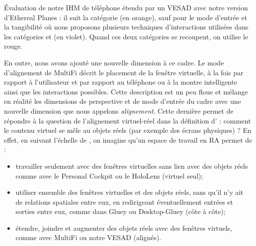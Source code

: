 {%
}{
  Évaluation de notre IHM de téléphone étendu par un VESAD avec notre version d'Ethereal Planes : il suit la catégorie  (en orange), sauf pour le mode d'entrée et la tangibilité où nous proposons plusieurs techniques d'interactions utilisées dans les catégories  et  (en violet). Quand ces deux catégories se recoupent, on utilise le rouge.
}

En outre, nous avons ajouté une nouvelle dimension à ce cadre. Le mode d'alignement de MultiFi \citep{Grubert2015} décrit le placement de la fenêtre virtuelle, à la fois par rapport à l'utilisateur et par rapport au téléphone ou à la montre intelligente ainsi que les interactions possibles. Cette description est un peu floue et mélange en réalité les dimensions de perspective et de mode d'entrée du cadre avec une nouvelle dimension que nous appelons \emph{alignement}. Cette dernière permet de répondre à la question de l'alignement virtuel-réel dans la définition d'\cite{Azuma1997} : comment le contenu virtuel se mêle au objets réels (par exemple des écrans physiques) ? En effet, en suivant l'échelle de \cite{Milgram1994}, on imagine qu'un espace de travail en RA permet de :
\begin{itemize}
  \item travailler seulement avec des fenêtres virtuelles sans lien avec des objets réels comme avec le Personal Cockpit ou le HoloLens (virtuel seul);
  \item utiliser ensemble des fenêtres virtuelles et des objets réels, sans qu'il n'y ait de relations spatiales entre eux, en redirigeant éventuellement entrées et sorties entre eux, comme dans Gluey ou Desktop-Gluey (côte à côte);
  \item étendre, joindre et augmenter des objets réels avec des fenêtres virtuels, comme avec MultiFi ou notre VESAD (alignés).
\end{itemize}
\medskip

